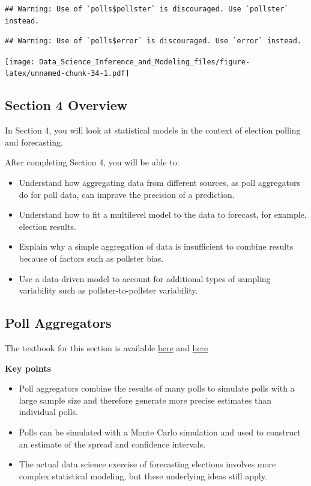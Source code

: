 \documentclass[
]{article}
\providecommand{\tightlist}{%
  \setlength{\itemsep}{0pt}\setlength{\parskip}{0pt}}
\begin{document}
\begin{verbatim}
## Warning: Use of `polls$pollster` is discouraged. Use `pollster` instead.
\end{verbatim}

\begin{verbatim}
## Warning: Use of `polls$error` is discouraged. Use `error` instead.
\end{verbatim}

\texttt{[image: Data\_Science\_Inference\_and\_Modeling\_files/figure-latex/unnamed-chunk-34-1.pdf]}

\hypertarget{section-4-overview}{%
\subsection{Section 4 Overview}\label{section-4-overview}}

In Section 4, you will look at statistical models in the context of
election polling and forecasting.

After completing Section 4, you will be able to:

\begin{itemize}
\tightlist
\item
  Understand how aggregating data from different sources, as poll
  aggregators do for poll data, can improve the precision of a
  prediction.
\item
  Understand how to fit a multilevel model to the data to forecast, for
  example, election results.
\item
  Explain why a simple aggregation of data is insufficient to combine
  results because of factors such as pollster bias.
\item
  Use a data-driven model to account for additional types of sampling
  variability such as pollster-to-pollster variability.
\end{itemize}

\hypertarget{poll-aggregators}{%
\subsection{Poll Aggregators}\label{poll-aggregators}}

The textbook for this section is available
\href{https://rafalab.github.io/dsbook/models.html}{here} and
\href{https://rafalab.github.io/dsbook/models.html\#poll-aggregators}{here}

\textbf{Key points}

\begin{itemize}
\tightlist
\item
  Poll aggregators combine the results of many polls to simulate polls
  with a large sample size and therefore generate more precise estimates
  than individual polls.
\item
  Polls can be simulated with a Monte Carlo simulation and used to
  construct an estimate of the spread and confidence intervals.
\item
  The actual data science exercise of forecasting elections involves
  more complex statistical modeling, but these underlying ideas still
  apply.
\end{itemize}
\end{document}
